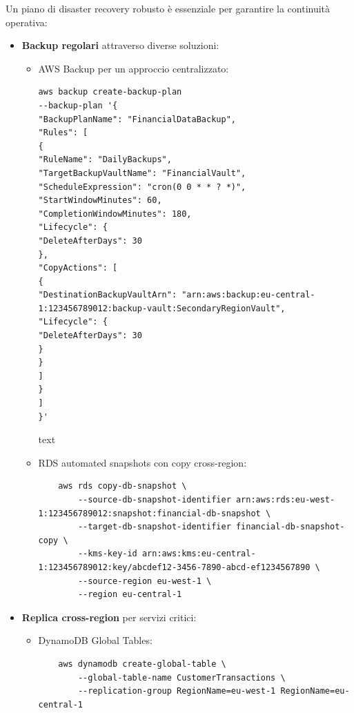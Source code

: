 \documentclass[a4paper,12pt]{report}
\begin{document}
Un piano di disaster recovery robusto è essenziale per garantire la continuità operativa:

\begin{itemize}
\item \textbf{Backup regolari} attraverso diverse soluzioni:
\begin{itemize}
\item AWS Backup per un approccio centralizzato:
\begin{verbatim}
aws backup create-backup-plan
--backup-plan '{
"BackupPlanName": "FinancialDataBackup",
"Rules": [
{
"RuleName": "DailyBackups",
"TargetBackupVaultName": "FinancialVault",
"ScheduleExpression": "cron(0 0 * * ? *)",
"StartWindowMinutes": 60,
"CompletionWindowMinutes": 180,
"Lifecycle": {
"DeleteAfterDays": 30
},
"CopyActions": [
{
"DestinationBackupVaultArn": "arn:aws:backup:eu-central-1:123456789012:backup-vault:SecondaryRegionVault",
"Lifecycle": {
"DeleteAfterDays": 30
}
}
]
}
]
}'
\end{verbatim}

text
    \item RDS automated snapshots con copy cross-region:
    \begin{verbatim}
    aws rds copy-db-snapshot \
        --source-db-snapshot-identifier arn:aws:rds:eu-west-1:123456789012:snapshot:financial-db-snapshot \
        --target-db-snapshot-identifier financial-db-snapshot-copy \
        --kms-key-id arn:aws:kms:eu-central-1:123456789012:key/abcdef12-3456-7890-abcd-ef1234567890 \
        --source-region eu-west-1 \
        --region eu-central-1
    \end{verbatim}
\end{itemize}

\item \textbf{Replica cross-region} per servizi critici:
\begin{itemize}
    \item DynamoDB Global Tables:
    \begin{verbatim}
    aws dynamodb create-global-table \
        --global-table-name CustomerTransactions \
        --replication-group RegionName=eu-west-1 RegionName=eu-central-1
    \end{verbatim}
    

\end{itemize}
\end{itemize}
\end{document}
